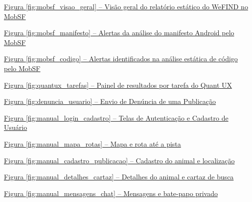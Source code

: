 \noindent \hyperref[fig:mobsf_visao_geral]{Figura \ref*{fig:mobsf_visao_geral} -- Visão geral do relatório estático do WeFIND no MobSF \dotfill \pageref{fig:mobsf_visao_geral}}\par\vspace{0.12cm}
\noindent \hyperref[fig:mobsf_manifesto]{Figura \ref*{fig:mobsf_manifesto} -- Alertas da análise do manifesto Android pelo MobSF \dotfill \pageref{fig:mobsf_manifesto}}\par\vspace{0.12cm}
\noindent \hyperref[fig:mobsf_codigo]{Figura \ref*{fig:mobsf_codigo} -- Alertas identificados na análise estática de código pelo MobSF \dotfill \pageref{fig:mobsf_codigo}}\par\vspace{0.12cm}
\noindent \hyperref[fig:quantux_tarefas]{Figura \ref*{fig:quantux_tarefas} -- Painel de resultados por tarefa do Quant UX \dotfill \pageref{fig:quantux_tarefas}}\par\vspace{0.12cm}
\noindent \hyperref[fig:denuncia_usuario]{Figura \ref*{fig:denuncia_usuario} -- Envio de Denúncia de uma Publicação \dotfill \pageref{fig:denuncia_usuario}}\par\vspace{0.12cm}
\noindent \hyperref[fig:manual_login_cadastro]{Figura \ref*{fig:manual_login_cadastro} -- Telas de Autenticação e Cadastro de Usuário \dotfill \pageref{fig:manual_login_cadastro}}\par\vspace{0.12cm}
\noindent \hyperref[fig:manual_mapa_rotas]{Figura \ref*{fig:manual_mapa_rotas} -- Mapa e rota até a pista \dotfill \pageref{fig:manual_mapa_rotas}}\par\vspace{0.12cm}
\noindent \hyperref[fig:manual_cadastro_publicacao]{Figura \ref*{fig:manual_cadastro_publicacao} -- Cadastro do animal e localização \dotfill \pageref{fig:manual_cadastro_publicacao}}\par\vspace{0.12cm}
\noindent \hyperref[fig:manual_detalhes_cartaz]{Figura \ref*{fig:manual_detalhes_cartaz} -- Detalhes do animal e cartaz de busca \dotfill \pageref{fig:manual_detalhes_cartaz}}\par\vspace{0.12cm}
\noindent \hyperref[fig:manual_mensagens_chat]{Figura \ref*{fig:manual_mensagens_chat} -- Mensagens e bate-papo privado \dotfill \pageref{fig:manual_mensagens_chat}}\par\vspace{0.12cm}
